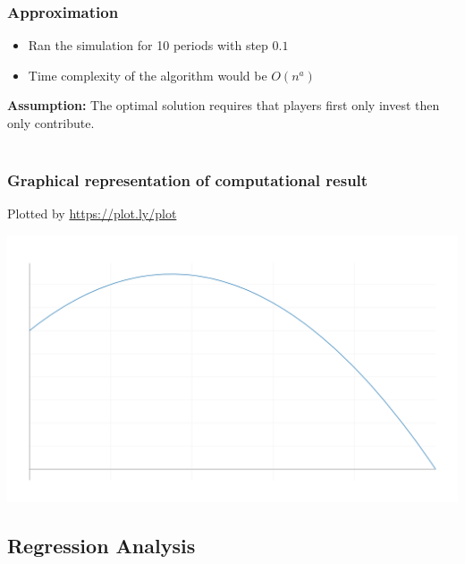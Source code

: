 		\begin{frame}
			\frametitle{Approximation} 
			
			\begin{itemize}
				\item
					Ran the simulation for 10 periods with step $0.1$
				\item
					Time complexity of the algorithm would be $O(n^a)$
			\end{itemize}
			
			\textbf{Assumption:} The optimal solution requires that players first only invest then only contribute. \\~\\

		\end{frame}

		\begin{frame}
			\frametitle{Graphical representation of computational result} 
			\begin{block}{Plotted by \url{https://plot.ly/plot}}
				\begin{center}
					\includegraphics[scale=0.18]{resources/plot.png}
				\end{center}
			\end{block}
		\end{frame}

	\subsection{Regression Analysis}
	
